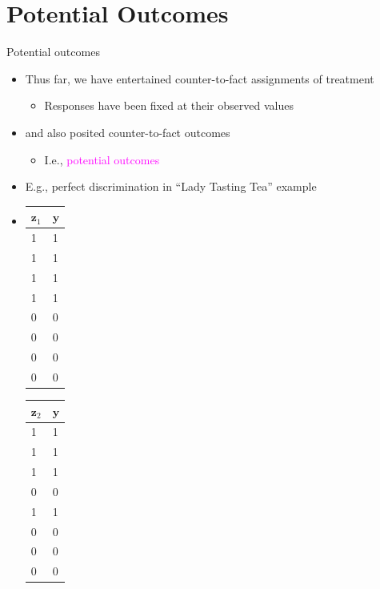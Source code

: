 \documentclass[table, xcolor = {dvipsnames}, 9pt]{beamer}
\theoremstyle{plain}
\begin{document}
\section{Potential Outcomes}
\begin{frame}{Potential outcomes}
\vfill
\begin{itemize} \vfill
\item Thus far, we have entertained counter-to-fact assignments of treatment \vfill
\begin{itemize} \vfill
\item[] Responses have been fixed at their observed values \vfill
\end{itemize} \vfill
\item \citet{neyman1923} and \citet{rubin1974} also posited counter-to-fact outcomes \vfill
\begin{itemize} \vfill
\item[] I.e., \textcolor{magenta}{potential outcomes} \vfill
\end{itemize} \vfill
\item E.g., perfect discrimination in ``Lady Tasting Tea'' example \vfill
\item[] \vfill
\vspace{2em}
\begin{table}[H]
\scriptsize
    \begin{tabular}{l|l}
    \toprule
    $\mathbf{z}_1$ & $\mathbf{y}$ \\ \midrule
    1 & 1  \\
    1 & 1   \\
    1 & 1   \\
    1 & 1  \\
    0 & 0  \\
    0 & 0  \\
    0 & 0  \\
    0 & 0  
    \end{tabular}
    \hfill
      \begin{tabular}{l|l}
      \toprule
    $\mathbf{z}_2$ & $\mathbf{y}$ \\ \midrule
    1 &  1  \\
    1 &  1  \\
    1 &  1  \\
    0 &  0   \\
    1 &  1  \\
    0 &  0  \\
    0 &  0  \\
    0 &  0  
    \end{tabular}
     \hfill
      \begin{tabular}{l|l}

\end{tabular}
\end{table}
\end{itemize}
\end{frame}
\end{document}

